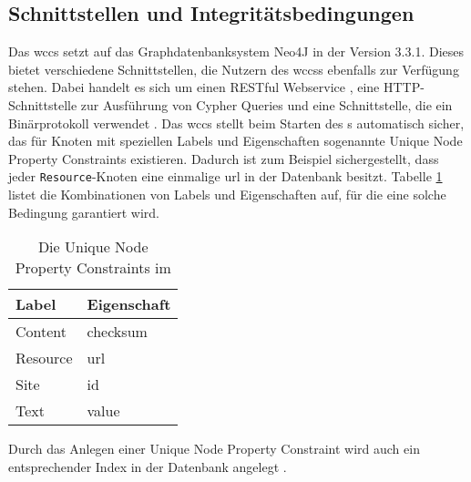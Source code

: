\subsection{Schnittstellen und Integritätsbedingungen}
    \label{section:solutionDetailsPersistenceDatabse}
    Das \gls{wccs} setzt auf das Graphdatenbanksystem Neo4J in der Version 3.3.1.
    Dieses bietet verschiedene Schnittstellen, die Nutzern des \glspl{wccs} ebenfalls zur Verfügung stehen.
    Dabei handelt es sich um einen RESTful Webservice \cite{neo4j:restDocumentation},
    eine HTTP-Schnittstelle zur Ausführung von Cypher Queries \cite[Kapitel 5]{neo4j:documentation}
    und eine Schnittstelle, die ein Binärprotokoll verwendet \cite[Kapitel 4]{neo4j:documentation}.
    Das \gls{wccs} stellt beim Starten des {\classificationStorage}s automatisch sicher,
    das für Knoten mit speziellen Labels und Eigenschaften sogenannte
    Unique Node Property Constraints
    \cite[Kapitel 3.5.2.2]{neo4j:documentation} existieren.
    Dadurch ist zum Beispiel sichergestellt,
    dass jeder \texttt{Resource}-Knoten eine einmalige \gls{url} in der Datenbank besitzt.
    Tabelle \ref{table:solutionDetailsPersistenceDatabaseConstraints}
    listet die Kombinationen von Labels und Eigenschaften auf,
    für die eine solche Bedingung garantiert wird.

    \begin{table}[tb]
        \centering
        \begin{tabular}{|l|l|}
            \hline
            \textbf{Label} & \textbf{Eigenschaft} \\ \hline
            Content        & checksum             \\ \hline
            Resource       & url                  \\ \hline
            Site           & id                   \\ \hline
            Text           & value                \\ \hline
        \end{tabular}
        \caption{Die Unique Node Property Constraints im {\classificationStorage}}
        \label{table:solutionDetailsPersistenceDatabaseConstraints}
    \end{table}

    Durch das Anlegen einer Unique Node Property Constraint wird auch ein entsprechender Index in der Datenbank angelegt
    \cite[Kapitel 3.5.2.2]{neo4j:documentation}. 
